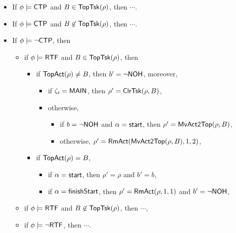 \begin{itemize}
	\item If $\phi \models {\sf CTP}$ and $B \in \mathsf{TopTsk}(\rho)$, then $\cdots$.
	\item If $\phi \models {\sf CTP}$ and $B \not \in \mathsf{TopTsk}(\rho)$, then $\cdots$.
	\item If $\phi \models \neg {\sf CTP}$, then
		\begin{itemize}
    			\item if $\phi \models {\sf RTF}$ and $B \in \mathsf{TopTsk}(\rho)$, then
    			\begin{itemize}
        				\item if $\mathsf{TopAct}(\rho) \neq B$, then $b' = \neg {\sf NOH}$, moreover, 
       	 			\begin{itemize}
            				\item if $\zeta_i = {\sf MAIN}$, then $\rho' = \mathsf{ClrTsk}(\rho, B)$,
            				\item otherwise,
            				\begin{itemize}
                					\item if $b = \neg {\sf NOH}$ and $\alpha = {\mathsf{start} }$, then $\rho'= \mathsf{MvAct2Top}(\rho, B)$, 
                					\item otherwise, $\rho' = \mathsf{RmAct}(\mathsf{MvAct2Top}(\rho, B), 1, 2)$, 
            				\end{itemize}
        				\end{itemize}
        				\item if $\mathsf{TopAct}(\rho) = B$, 
						\begin{itemize}
							\item if $\alpha = {\mathsf{start} }$, then $\rho' = \rho$ and $b' = b$,
							\item if $\alpha = {\mathsf{finishStart} }$, then $\rho' = \mathsf{RmAct}(\rho, 1, 1)$ and $b' = \neg{\sf NOH}$,
						\end{itemize}
    			\end{itemize}
			\item if $\phi \models {\sf RTF}$ and $B \not \in \mathsf{TopTsk}(\rho)$, then $\cdots$,
			\item if $\phi \models \neg {\sf RTF}$, then $\cdots$.
		\end{itemize}
\end{itemize}


